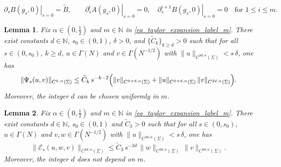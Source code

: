 \documentclass[10pt,a4paper]{amsart}
\newtheorem{lemma}{Lemma}
\newcommand{\N}{\mathbb{N}}
\begin{document}
\begin{equation}
	\label{eq_taylor_expansion_label_m}
	\left.\partial_s B(g_s, 0)\right|_{s=0}=\widetilde B,
	\qquad
	\left.\partial_s^i A(g_s, 0)\right|_{s=0}=0,\quad \left.\partial_s^{i+1}B(g_s, 0)\right|_{s=0}=0 \quad \text{for } 1\le i\le m.
\end{equation}

\begin{lemma}
	\label{lem:tame-estimates-inverse-As}
	Fix $\alpha\in(0,\tfrac12)$ and $m\in\N$ in \eqref{eq_taylor_expansion_label_m}.
	There exist constants $d\in\N$, $s_0\in(0,1)$, $\delta>0$, and $\{\widetilde C_k\}_{k\ge d}>0$
	such that for all $s\in(0,s_0)$, $k\ge d$, $u\in\Gamma(N)$ and $v\in\Gamma(N^{-1/2})$
	with $\|u\|_{C^{3d,\alpha}(\Sigma)}< s\,\delta$, one has
	\[
	\|\Psi_s(u,v)\|_{C^{k,\alpha}(\Sigma)}
	\le \widetilde C_k\, s^{-k-2}\Bigl(
	\|v\|_{C^{k+d,\alpha}(\Sigma)}
	+\|u\|_{C^{k+d,\alpha}(\Sigma)}\,\|v\|_{C^{2d,\alpha}(\Sigma)}
	\Bigr).
	\]
	Moreover, the integer $d$ can be chosen uniformly in $m$.
\end{lemma}

\begin{lemma}
	\label{lem:tame-estimates-quadratic-error}
	Fix $\alpha\in(0,\tfrac12)$ and $m\in\N$ in \eqref{eq_taylor_expansion_label_m}.
	There exist constants $d\in\N$, $s_0\in(0,1)$ and $\widetilde C_3>0$ such that for all
	$s\in(0,s_0)$, $u\in\Gamma(N)$ and $v,w\in\Gamma(N^{-1/2})$ with
	$\|u\|_{C^{3d,\alpha}(\Sigma)}< s\,\delta$, one has
	\[
	\|\mathcal E_s(u,w,v)\|_{C^{2d,\alpha}(\Sigma)}
	\le \widetilde C_3\, s^{-3d}\,
	\|w\|_{C^{3d,\alpha}(\Sigma)}\,\|v\|_{C^{3d,\alpha}(\Sigma)}.
	\]
	Moreover, the integer $d$ does not depend on $m$.
\end{lemma}
\end{document}
